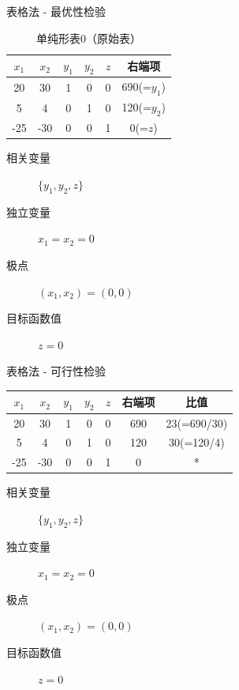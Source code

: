 \documentclass[mathserif, table]{beamer}
\begin{document}
\begin{frame}{表格法 - 最优性检验}

  \begin{table}
    \centering
    \begin{tabular}{|ccccc|c|}
      \hline
      $x_1$ & {\color{red}$x_2$} & $y_1$ & $y_2$ & $z$ & 右端项 \\
      \hline
      20 & 30 & 1 & 0 & 0 & 690(=$y_1$)\\
      5 & 4 & 0 & 1 & 0 & 120(=$y_2$)\\
      \hline
      -25 & {\color{red} -30} & 0 & 0 & 1 & 0(=$z$)\\
      \hline
    \end{tabular}
    \caption{单纯形表0（原始表）}
  \end{table}

  \begin{description}
  \item[相关变量] $\{y_1, y_2, z\}$
  \item[独立变量] $x_1=x_2=0$
  \item[极点] $(x_1, x_2) = (0, 0)$
  \item[目标函数值] $z = 0$
  \end{description}

\end{frame}

\begin{frame}{表格法 - 可行性检验}

  \begin{table}
    \centering
    \begin{tabular}{|ccccc|c|c|}
      \hline
      $x_1$ & {\color{red} $x_2$} & $y_1$ & $y_2$ & $z$ & 右端项 & 比值 \\
      \hline
      20 & 30 & 1 & 0 & 0 & 690 & {\color{green}23(=690/30)}\\
      5 & 4 & 0 & 1 & 0 & 120 & 30(=120/4)\\
      \hline
      -25 & {\color{red} -30} & 0 & 0 & 1 & 0 &*\\
      \hline
    \end{tabular}
  \end{table}

  \begin{description}
  \item[相关变量] $\{y_1, y_2, z\}$
  \item[独立变量] $x_1=x_2=0$
  \item[极点] $(x_1, x_2) = (0, 0)$
  \item[目标函数值] $z = 0$
  \end{description}

\end{frame}
\end{document}
